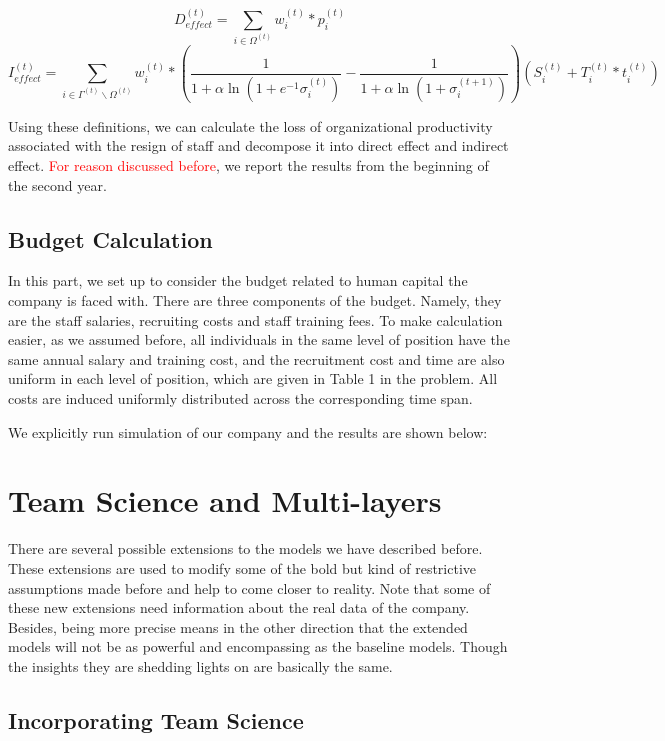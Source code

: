 \documentclass[tcn = 37075, sheet = true, abstract = true]{mcmthesis}
\begin{document}
$$D^{(t)}_{effect}=\sum\limits_{i\in\Omega^{(t)}}w_i^{(t)}*p_i^{(t)}$$ $$I^{(t)}_{effect}=\sum\limits_{i\in\Gamma^{(t)}\backslash\Omega^{(t)}} w_i^{(t)}*(\frac{1}{1+\alpha\ln{(1+e^{-1}\sigma_i^{(t)})}}-\frac{1}{1+\alpha\ln{(1+\sigma_i^{(t+1)})}})(S_i^{(t)}+T_i^{(t)}*t_i^{(t)})$$

Using these definitions, we can calculate the loss of organizational productivity associated with the resign of staff and decompose it into direct effect and indirect effect. \textcolor{red}{For reason discussed before}, we report the results from the beginning of the second year.


\subsection{Budget Calculation}

In this part, we set up to consider the budget related to human capital the company is faced with. There are three components of the budget. Namely, they are the staff salaries, recruiting costs and staff training fees. To make calculation easier, as we assumed before, all individuals in the same level of position have the same annual salary and training cost, and the recruitment cost and time are also uniform in each level of position, which are given in Table 1 in the problem. All costs are induced uniformly distributed across the corresponding time span.

We explicitly run simulation of our company and the results are shown below:

\section{Team Science and Multi-layers}
There are several possible extensions to the models we have described before. These extensions are used to modify some of the bold but kind of restrictive assumptions made before and help to come closer to reality. Note that some of these new extensions need information about the real data of the company. Besides, being more precise means in the other direction that the extended models will not be as powerful and encompassing as the baseline models. Though the insights they are shedding lights on are basically the same.

\subsection{Incorporating Team Science}
\end{document}
